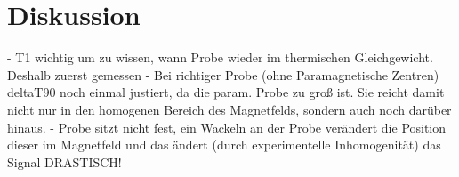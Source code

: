 \section{Diskussion}
\label{sec:Diskussion}

- T1 wichtig um zu wissen, wann Probe wieder im thermischen Gleichgewicht.
  Deshalb zuerst gemessen
- Bei richtiger Probe (ohne Paramagnetische Zentren) deltaT90 noch einmal justiert,
  da die param. Probe zu groß ist. Sie reicht damit nicht nur in den homogenen
  Bereich des Magnetfelds, sondern auch noch darüber hinaus.
- Probe sitzt nicht fest, ein Wackeln an der Probe verändert die Position dieser im
  Magnetfeld und das ändert (durch experimentelle Inhomogenität) das Signal DRASTISCH!
